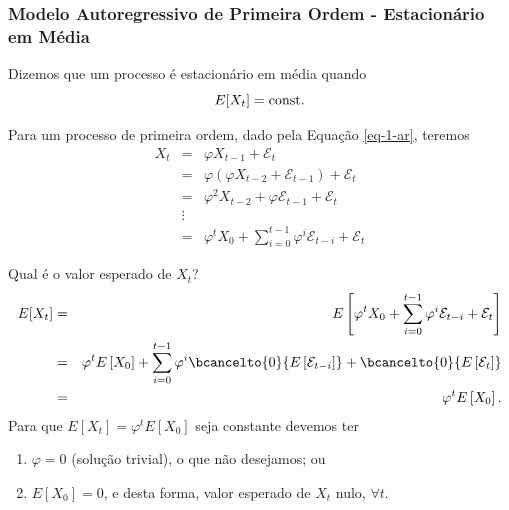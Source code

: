 \begin{frame}[allowframebreaks]
  \frametitle{Modelo Autoregressivo de Primeira Ordem - Estacionário em Média}
  Dizemos que um processo é estacionário em média quando
  \begin{equation}
  E[X_t] = \textmd{const.}
  \end{equation}
  
  Para um processo de primeira ordem, dado pela Equação \ref{eq-1-ar}, teremos
  \begin{eqnarray}
  X_t &=& \varphi X_{t-1} + \mathcal{E}_t \nonumber \\
      &=& \varphi \left( \varphi X_{t-2} + \mathcal{E}_{t-1} \right) + \mathcal{E}_t \nonumber \\
      &=& \varphi^2 X_{t-2} + \varphi \mathcal{E}_{t-1} + \mathcal{E}_t \nonumber \\
      &\vdots& \\
      &=& \varphi^t X_{0} + \sum_{i=0}^{t-1} \varphi^i \mathcal{E}_{t-i} + \mathcal{E}_t
  \end{eqnarray}
  
  Qual é o valor esperado de $X_t$?
  \begin{eqnarray}
  E[X_t] &=& E\left[ \varphi^t X_{0} + \sum_{i=0}^{t-1} \varphi^i \mathcal{E}_{t-i} + \mathcal{E}_t \right] \nonumber \\
         &=& \varphi^t E\left[ X_{0} \right] + \sum_{i=0}^{t-1} \varphi^i \bcancelto{0}{E\left[ \mathcal{E}_{t-i} \right]} + \bcancelto{0}{E\left[ \mathcal{E}_{t} \right]} \nonumber \\
         &=& \varphi^t E\left[ X_{0} \right] .
  \end{eqnarray}
  Para que $E[X_t] = \varphi^t E[ X_{0}]$ seja constante devemos ter
  \begin{enumerate}
        \item $\varphi = 0$ (solução trivial), o que não desejamos; ou
        \item $E[X_{0}] = 0$, e desta forma, valor esperado de $X_t$ nulo, $\forall t$.
  \end{enumerate}
\end{frame}


